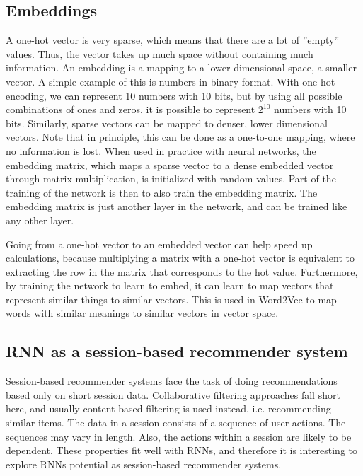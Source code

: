 \subsection{Embeddings}
\label{sec:embeddings}
A one-hot vector is very sparse, which means that there are a lot of ''empty'' values. Thus, the vector takes up much space without containing much information. An embedding is a mapping to a lower dimensional space, a smaller vector. A simple example of this is numbers in binary format. With one-hot encoding, we can represent 10 numbers with 10 bits, but by using all possible combinations of ones and zeros, it is possible to represent $2^10$ numbers with 10 bits. Similarly, sparse vectors can be mapped to denser, lower dimensional vectors. Note that in principle, this can be done as a one-to-one mapping, where no information is lost. When used in practice with neural networks, the embedding matrix, which maps a sparse vector to a dense embedded vector through matrix multiplication, is initialized with random values. Part of the training of the network is then to also train the embedding matrix. The embedding matrix is just another layer in the network, and can be trained like any other layer.

Going from a one-hot vector to an embedded vector can help speed up calculations, because multiplying a matrix with a one-hot vector is equivalent to extracting the row in the matrix that corresponds to the hot value. Furthermore, by training the network to learn to embed, it can learn to map vectors that represent similar things to similar vectors. This is used in Word2Vec \cite{DBLP:journals/corr/abs-1301-3781} to map words with similar meanings to similar vectors in vector space.


\subsection{RNN as a session-based recommender system}
Session-based recommender systems face the task of doing recommendations based only on short session data. Collaborative filtering approaches fall short here, and usually content-based filtering is used instead, i.e. recommending similar items. The data in a session consists of a sequence of user actions. The sequences may vary in length. Also, the actions within a session are likely to be dependent. These properties fit well with RNNs, and therefore it is interesting to explore RNNs potential as session-based recommender systems.

